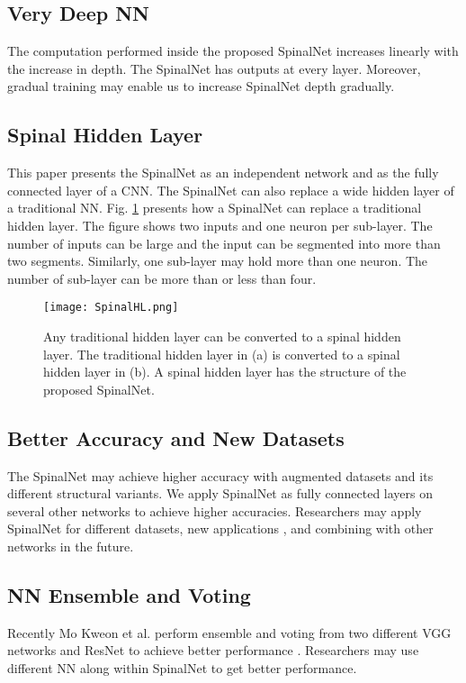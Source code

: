 \documentclass[journal]{IEEEtran}
\begin{document}
\subsection{Very Deep NN}
The computation performed inside the proposed SpinalNet increases linearly with the increase in depth. The SpinalNet has outputs at every layer. Moreover, gradual training may enable us to increase SpinalNet depth gradually. 



\subsection{Spinal Hidden Layer}
This paper presents the SpinalNet as an independent network and as the fully connected layer of a CNN. The SpinalNet can also replace a wide hidden layer of a traditional NN. Fig. \ref{SpinalHL} presents how a SpinalNet can replace a traditional hidden layer. The figure shows two inputs and one neuron per sub-layer. The number of inputs can be large and the input can be segmented into more than two segments. Similarly, one sub-layer may hold more than one neuron.  The number of sub-layer can be more than or less than four.  

\begin{figure}
  \centering
  \texttt{[image: SpinalHL.png]}
  \caption{Any traditional hidden layer can be converted to a spinal hidden layer. The traditional hidden layer in (a) is converted to a spinal hidden layer in (b). A spinal hidden layer has the structure of the proposed SpinalNet.}
  \label{SpinalHL}
\end{figure}

\subsection{Better Accuracy and New Datasets}
The SpinalNet may achieve higher accuracy with augmented datasets and its different structural variants. We apply SpinalNet as fully connected layers on several other networks to achieve higher accuracies. Researchers may apply SpinalNet for different datasets, new applications \cite{kabir2018neural,rahman2018unified, neven2018towards}, and combining with other networks in the future. 

\subsection{NN Ensemble and Voting}
Recently Mo Kweon et al. perform ensemble and voting from two different VGG networks and ResNet to achieve better performance \cite{VGG5}. Researchers may use different NN along within SpinalNet to get better performance.
\end{document}
